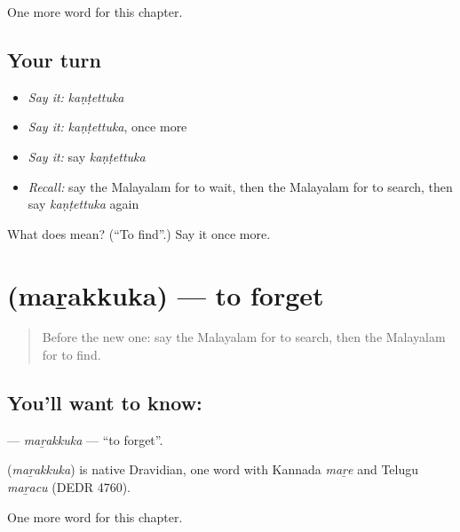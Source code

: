 \begin{grammarlens}[title={What you've built}]
One more word for this chapter.
\end{grammarlens}

\subsection*{Your turn}
\begin{itemize}
\raggedright
  \item \emph{Say it:} \emph{kaṇṭettuka}
  \item \emph{Say it:} \emph{kaṇṭettuka}, once more
  \item \emph{Say it:} say \emph{kaṇṭettuka}
  \item \emph{Recall:} say the Malayalam for to wait, then the Malayalam for to search, then say \emph{kaṇṭettuka} again
\end{itemize}

\begin{tcolorbox}[breakable,colback=teal!4,colframe=teal!35!black,title={Before you move on}]
What does  mean? (\textquotedblleft{}To find\textquotedblright{}.) Say it once more.
\end{tcolorbox}
\section[\texorpdfstring{\ml{മറക്കുക} (maṟakkuka)}{മറക്കുക (maṟakkuka)}]{ (maṟakkuka) — to forget}

\label{lesson:ML-C174-marakkuka}



\begin{quote}
Before the new one: say the Malayalam for to search, then the Malayalam for to find.
\end{quote}

\subsection*{You'll want to know: }
\textbf{} — \emph{maṟakkuka} — \textquotedblleft{}to forget\textquotedblright{}.

\begin{cousinweb}
\textbf{} (\emph{maṟakkuka}) is native Dravidian, one word with Kannada \emph{maṟe} and Telugu \emph{maṟacu} (DEDR 4760).
\end{cousinweb}

\begin{grammarlens}[title={What you've built}]
One more word for this chapter.
\end{grammarlens}


